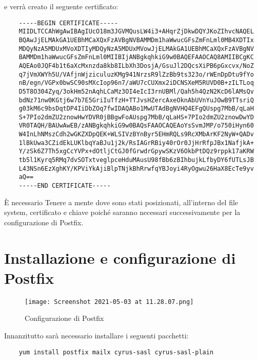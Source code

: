 e verrà creato il seguente certificato:

\begin{verbatim}
    -----BEGIN CERTIFICATE-----
    MIIDLTCCAhWgAwIBAgIUcO18m3JGVMQusLW4i3+AHqrZjDkwDQYJKoZIhvcNAQEL
    BQAwJjELMAkGA1UEBhMCaXQxFzAVBgNVBAMMDm1haWwucGFsZmFnLml0MB4XDTIx
    MDQyNzA5MDUxMVoXDTIyMDQyNzA5MDUxMVowJjELMAkGA1UEBhMCaXQxFzAVBgNV
    BAMMDm1haWwucGFsZmFnLml0MIIBIjANBgkqhkiG9w0BAQEFAAOCAQ8AMIIBCgKC
    AQEAo0JQF4b1t6aXcMxnzda8kb8ILbXh3DosjA/GsuJl2DQcsXiPB6pGxcvx/NoZ
    q7jVmXWYh5U/VAfjnWjziculuzKMg941NrzsR9lZzBb9ts323o/rWEnDpDtu9fYo
    nB/egn/VGPx0bwSC90sMXcIop96n7/aWU7cCUXmx2iDCNSXeM5RUVD0B+zILTLoq
    D5T8O304Zyq/3okHm52nAqhLCaMz3OI4eIcI3rnUBMl/Qah5h4QzN2KcD6lAMsQv
    bdNz71nw0KGtj6w7b7E5GriIuTfzH+TTJvsHZercAxeOknAbUVnYuJOwB9TTsriQ
    g03kM6c9bsDqtDP4IiDbZOq7fwIDAQABo1MwUTAdBgNVHQ4EFgQUspg7MbB/qLaH
    S+7PIo2dmZU2znowHwYDVR0jBBgwFoAUspg7MbB/qLaHS+7PIo2dmZU2znowDwYD
    VR0TAQH/BAUwAwEB/zANBgkqhkiG9w0BAQsFAAOCAQEAoYsSvmJMP/o750iHyn60
    W4InLhNMszCdh2wGKZXDpQEK+WLSIVzBYnByr5EHmRQLs9RcXMbArKF2NyW+QADv
    1lBkUwa3CZidEkLUKlbqYaBJu1j2k/RsIAGrRBiy40rOr0JjHrRfpJBx1NafjkA+
    Y/zSk6Z7Th5xgCcYVPx+dOtljCtGJ0fGrwdrGpywSKzV6OkbPtDQz9rppk17aKRW
    tb5l1Kyrq5RMq7dvSOTxtveglpceHduMAusU98fBb6zBIhbujkLfbyDY6fUTLsJB
    L43NSn6EzXghKY/KPViYkAjiBlpTNjkBhRrwfqYBJoyi4RyOgwu26HaX8EcTe9yv
    aQ==
    -----END CERTIFICATE-----

\end{verbatim}

È necessario Tenere a mente dove sono stati posizionati, all’interno del file system, 
certificato e chiave poiché saranno necessari successivamente per la configurazione di Postfix.

\section{Installazione e configurazione di Postfix}

\begin{figure}[htp]
    \centering
    \texttt{[image: Screenshot 2021-05-03 at 11.28.07.png]}
    \caption{Configurazione di Postfix}\label{confPostfix}
  \end{figure}

Innanzitutto sarà necessario installare i seguenti pacchetti:

\begin{verbatim}
    yum install postfix mailx cyrus-sasl cyrus-sasl-plain
\end{verbatim}


